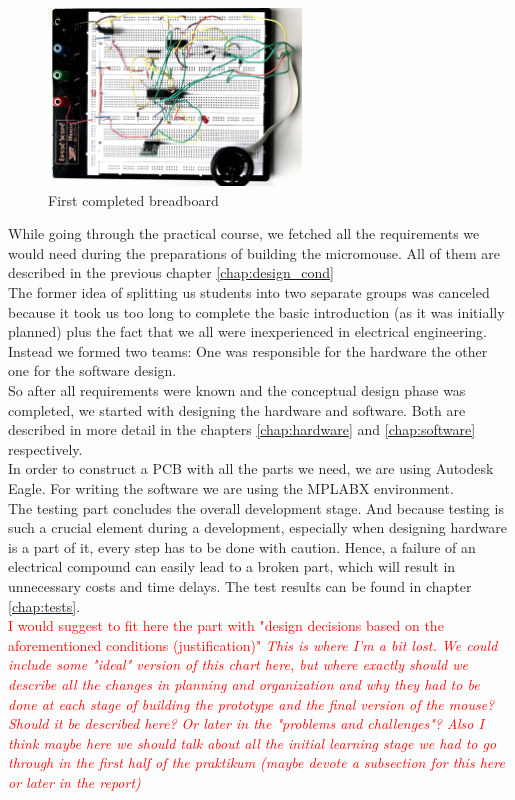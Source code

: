 \begin{figure}[H]
    \centering
    \includegraphics[width=0.6\textwidth]{figures/breadboard.jpeg}
    \caption{First completed breadboard}
    \label{fig:breadboard}
\end{figure}

\noindent
While going through the practical course, we fetched all the requirements we would need during the preparations of building the micromouse. All of them are described in the previous chapter \ref{chap:design_cond} \\

\noindent
The former idea of splitting us students into two separate groups was canceled because it took us too long to complete the basic introduction (as it was initially planned) plus the fact that we all were inexperienced in electrical engineering. Instead we formed two teams: One was responsible for the hardware the other one for the software design. \\
So after all requirements were known and the conceptual design phase was completed, we started with designing the hardware and software. Both are described in more detail in the chapters \ref{chap:hardware} and \ref{chap:software} respectively. \\
In order to construct a PCB with all the parts we need, we are using Autodesk Eagle. For writing the software we are using the MPLABX environment. \\

\noindent
The testing part concludes the overall development stage. And because testing is such a crucial element during a development, especially when designing hardware is a part of it, every step has to be done with caution. Hence, a failure of an electrical compound can easily lead to a broken part, which will result in unnecessary costs and time delays. The test results can be found in chapter \ref{chap:tests}. \\

\textcolor{red}{I would suggest to fit here the part with "design decisions based on the aforementioned conditions (justification)"
\textit{ This is where I'm a bit lost. We could include some "ideal" version of this chart here, but where exactly should we describe all the changes in planning and organization and why they had to be done at each stage of building the prototype and the final version of the mouse?  Should it be described here? Or later in the "problems and challenges"?
Also I think maybe here we should talk about all the initial learning stage we had to go through in the first half of the praktikum (maybe devote a subsection for this here or later in the report)}}

